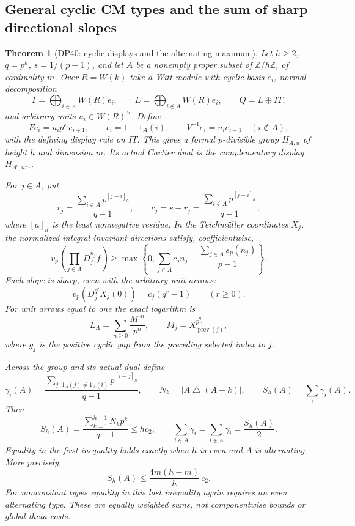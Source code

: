 \documentclass[11pt,a4paper]{article}
\newtheorem{theorem}{Theorem}[section]
\theoremstyle{definition}\newtheorem{remark}[theorem]{Remark}
\newcommand{\Z}{\mathbb Z}\newcommand{\Q}{\mathbb Q}\newcommand{\F}{\mathbb F}
\newcommand{\vp}{v_p}\newcommand{\dR}{\mathrm{dR}}\newcommand{\crys}{\mathrm{crys}}
\begin{document}
\subsection{General cyclic CM types and the sum of sharp directional slopes}

\begin{theorem}[DP40: cyclic displays and the alternating maximum]\label{DP40}
Let $h\ge2$, $q=p^h$, $s=1/(p-1)$, and let $A$ be a nonempty proper subset of $\Z/h\Z$, of cardinality $m$. Over $R=W(k)$ take a Witt module with cyclic basis $e_i$, normal decomposition
\[
 T=\bigoplus_{i\in A}W(R)e_i,\qquad
 L=\bigoplus_{i\notin A}W(R)e_i,\qquad Q=L\oplus IT,
\]
and arbitrary units $u_i\in W(R)^\times$. Define
\[
 Fe_i=u_ip^{\epsilon_i}e_{i+1},\qquad
 \epsilon_i=1-1_A(i),\qquad
 V^{-1}e_i=u_ie_{i+1}\quad(i\notin A),
\]
with the defining display rule on $IT$. This gives a formal $p$-divisible group $H_{A,u}$ of height $h$ and dimension $m$. Its actual Cartier dual is the complementary display $H_{A^c,u^{-1}}$.

For $j\in A$, put
\[
 r_j=\frac{\sum_{i\in A}p^{[j-i]_h}}{q-1},\qquad
 c_j=s-r_j=\frac{\sum_{i\notin A}p^{[j-i]_h}}{q-1},
\]
where $[a]_h$ is the least nonnegative residue. In the Teichm\"uller coordinates $X_j$, the normalized integral invariant directions satisfy, coefficientwise,
\begin{equation}\label{eq:cyclicmixed}
 \vp\left(\prod_{j\in A}D_j^{n_j}f\right)
 \ge\max\left\{0,\sum_{j\in A}c_jn_j-
                   \frac{\sum_{j\in A}s_p(n_j)}{p-1}\right\}.
\end{equation}
Each slope is sharp, even with the arbitrary unit arrows:
\[
 \vp(D_j^{q^r}X_j(0))=c_j(q^r-1)\qquad(r\ge0).
\]
For unit arrows equal to one the exact logarithm is
\[
 L_A=\sum_{n\ge0}\frac{M^{\circ n}}{p^n},\qquad
 M_j=X_{\operatorname{prev}(j)}^{p^{g_j}},
\]
where $g_j$ is the positive cyclic gap from the preceding selected index to $j$.

Across the group and its actual dual define
\[
 \gamma_i(A)=\frac{\sum_{j:\,1_A(j)\ne1_A(i)}p^{[i-j]_h}}{q-1},
 \qquad N_k=|A\mathbin\triangle(A+k)|,\qquad
 S_h(A)=\sum_i\gamma_i(A).
\]
Then
\begin{equation}\label{eq:cyclicmax}
 S_h(A)=\frac{\sum_{k=1}^{h-1}N_kp^k}{q-1}
 \le h c_2,\qquad
 \sum_{i\in A}\gamma_i=\sum_{i\notin A}\gamma_i=\frac{S_h(A)}2.
\end{equation}
Equality in the first inequality holds exactly when $h$ is even and $A$ is alternating. More precisely,
\[
 S_h(A)\le \frac{4m(h-m)}h\,c_2.
\]
For nonconstant types equality in this last inequality again requires an even alternating type. These are equally weighted sums, not componentwise bounds or global theta costs.
\end{theorem}
\end{document}
